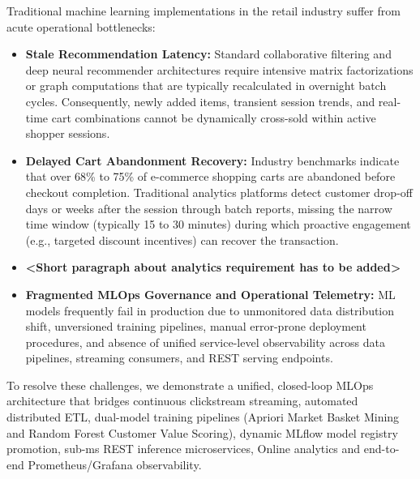 \documentclass[11pt,a4paper]{article}
\begin{document}
Traditional machine learning implementations in the retail industry suffer from acute operational bottlenecks:

\begin{itemize}
    \item \textbf{Stale Recommendation Latency:} Standard collaborative filtering and deep neural recommender architectures require intensive matrix factorizations or graph computations that are typically recalculated in overnight batch cycles. Consequently, newly added items, transient session trends, and real-time cart combinations cannot be dynamically cross-sold within active shopper sessions.
    \item \textbf{Delayed Cart Abandonment Recovery:} Industry benchmarks indicate that over 68\% to 75\% of e-commerce shopping carts are abandoned before checkout completion. Traditional analytics platforms detect customer drop-off days or weeks after the session through batch reports, missing the narrow time window (typically 15 to 30 minutes) during which proactive engagement (e.g., targeted discount incentives) can recover the transaction.
    
    \item \textbf{<Short paragraph about analytics requirement has to be added>}
    
    \item \textbf{Fragmented MLOps Governance and Operational Telemetry:} ML models frequently fail in production due to unmonitored data distribution shift, unversioned training pipelines, manual error-prone deployment procedures, and absence of unified service-level observability across data pipelines, streaming consumers, and REST serving endpoints.
\end{itemize}

To resolve these challenges, we demonstrate a unified, closed-loop MLOps architecture that bridges continuous clickstream streaming, automated distributed ETL, dual-model training pipelines (Apriori Market Basket Mining and Random Forest Customer Value Scoring), dynamic MLflow model registry promotion, sub-ms REST inference microservices, Online analytics and end-to-end Prometheus/Grafana observability.
\end{document}
